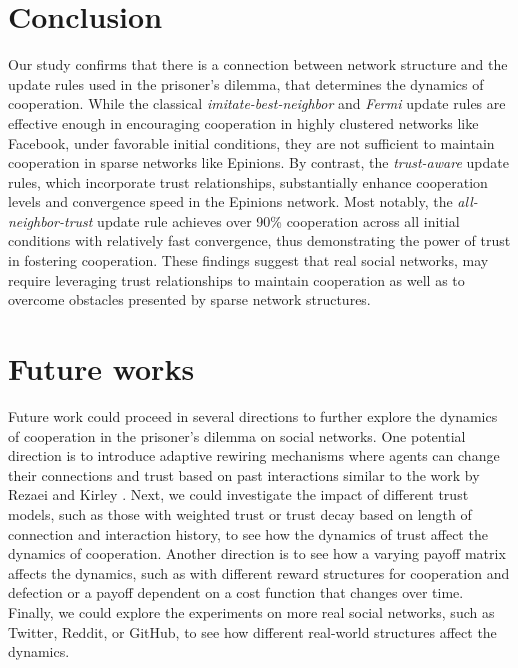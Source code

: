 \section{Conclusion}
Our study confirms that there is a connection between network structure and the update rules used in the prisoner's dilemma, that determines the dynamics of cooperation. 
While the classical \emph{imitate-best-neighbor} and \emph{Fermi} update rules are effective enough in encouraging cooperation in highly clustered networks like Facebook, under favorable initial conditions,
they are not sufficient to maintain cooperation in sparse networks like Epinions. By contrast, the \emph{trust-aware} update rules, which incorporate trust relationships, 
substantially enhance cooperation levels and convergence speed in the Epinions network.
Most notably, the \emph{all-neighbor-trust} update rule achieves over 90\% cooperation across all initial conditions with relatively fast convergence, thus demonstrating the power of trust in fostering cooperation.
These findings suggest that real social networks, may require leveraging trust relationships to maintain cooperation as well as to overcome obstacles presented by sparse network structures.

\section{Future works}
Future work could proceed in several directions to further explore the dynamics of cooperation in the prisoner's dilemma on social networks.
One potential direction is to introduce adaptive rewiring mechanisms where agents can change their connections and trust based on past interactions similar to the work by Rezaei and Kirley \cite{RezaeiKirley2012}.
Next, we could investigate the impact of different trust models, such as those with weighted trust or trust decay based on length of connection and interaction history, to see how the dynamics of trust affect the dynamics of cooperation.
Another direction is to see how a varying payoff matrix affects the dynamics, such as with different reward structures for cooperation and defection or a payoff dependent on a cost function that changes over time.
Finally, we could explore the experiments on more real social networks, such as Twitter, Reddit, or GitHub, to see how different real-world structures affect the dynamics.